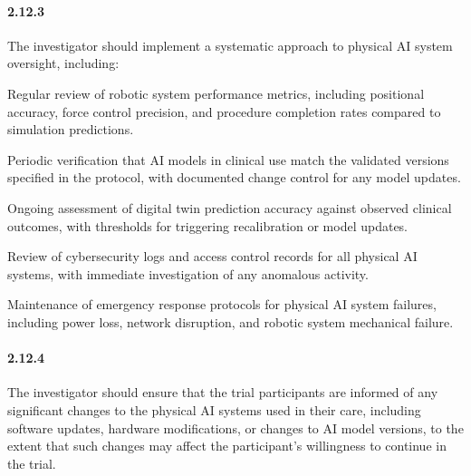 \documentclass[11pt]{article}
\begin{document}
\paragraph{2.12.3} The investigator should implement a systematic approach to physical AI system oversight, including:

\begin{description}[leftmargin=2.5cm,style=sameline]

\item[(a)] Regular review of robotic system performance metrics, including positional accuracy, force control precision, and procedure completion rates compared to simulation predictions.

\item[(b)] Periodic verification that AI models in clinical use match the validated versions specified in the protocol, with documented change control for any model updates.

\item[(c)] Ongoing assessment of digital twin prediction accuracy against observed clinical outcomes, with thresholds for triggering recalibration or model updates.

\item[(d)] Review of cybersecurity logs and access control records for all physical AI systems, with immediate investigation of any anomalous activity.

\item[(e)] Maintenance of emergency response protocols for physical AI system failures, including power loss, network disruption, and robotic system mechanical failure.

\end{description}

\paragraph{2.12.4} The investigator should ensure that the trial participants are informed of any significant changes to the physical AI systems used in their care, including software updates, hardware modifications, or changes to AI model versions, to the extent that such changes may affect the participant's willingness to continue in the trial.
\end{document}
